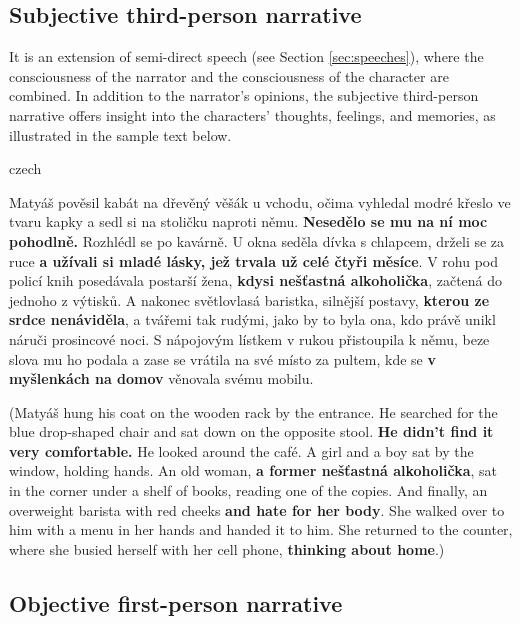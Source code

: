 \subsection{Subjective third-person narrative}

It is an extension of semi-direct speech (see Section \ref{sec:speeches}), where the consciousness of the narrator and the consciousness of the character are combined. \cite[p.~393]{muller-sidak-slovnik}
In addition to the narrator's opinions, the subjective third-person narrative offers insight into the characters' thoughts, feelings, and memories, as illustrated in the sample text below.
\newline
\begin{otherlanguage*}{czech}
\begin{quoting}
Matyáš pověsil kabát na dřevěný věšák u vchodu, očima vyhledal modré křeslo ve tvaru kapky a sedl si na stoličku naproti němu. \textbf{Nesedělo se mu na ní moc pohodlně.} Rozhlédl se po kavárně. U okna seděla dívka s chlapcem, drželi se za ruce \textbf{a užívali si mladé lásky, jež trvala už celé čtyři měsíce}. V rohu pod policí knih posedávala postarší žena, \textbf{kdysi nešťastná alkoholička}, začtená do jednoho z výtisků. A nakonec světlovlasá baristka, silnější postavy, \textbf{kterou ze srdce nenáviděla}, a tvářemi tak rudými, jako by to byla ona, kdo právě unikl náruči prosincové noci. S nápojovým lístkem v rukou přistoupila k němu, beze slova mu ho podala a zase se vrátila na své místo za pultem, kde se \textbf{v myšlenkách na domov} věnovala svému mobilu.
\newline
\end{quoting}
\end{otherlanguage*}
\begin{quoting}
(Matyáš hung his coat on the wooden rack by the entrance. He searched for the blue drop-shaped chair and sat down on the opposite stool. \textbf{He didn't find it very comfortable.} He looked around the café. A girl and a boy sat by the window, holding hands. An old woman, \textbf{a former nešťastná alkoholička}, sat in the corner under a shelf of books, reading one of the copies. And finally, an overweight barista with red cheeks \textbf{and hate for her body}. She walked over to him with a menu in her hands and handed it to him. She returned to the counter, where she busied herself with her cell phone, \textbf{thinking about home}.)
\newline
\end{quoting}

\subsection{Objective first-person narrative}

